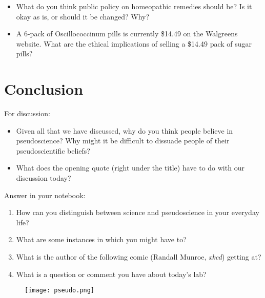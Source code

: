 \documentclass[12pt]{article}
\begin{document}
\begin{itemize}
\item What do you think public policy on homeopathic remedies should be? Is it okay as is, or should it be changed? Why?
\item A 6-pack of Oscillococcinum pills is currently \$14.49 on the Walgreens website. What are the ethical implications of selling a \$14.49 pack of sugar pills? 
\end{itemize}

\section{Conclusion}
For discussion:
\begin{itemize}
\item Given all that we have discussed, why do you think people believe in pseudoscience? Why might it be difficult to dissuade people of their pseudoscientific beliefs?
\item What does the opening quote (right under the title) have to do with our discussion today?
\end{itemize}
Answer in your notebook:
\begin{enumerate}
\item How can you distinguish between science and pseudoscience in your everyday life? 
\item What are some instances in which you might have to?
\item What is the author of the following comic (Randall Munroe, \textit{xkcd}) getting at?
\item What is a question or comment you have about today's lab?
\end{enumerate}
\begin{figure}[th]
\begin{center}
\texttt{[image: pseudo.png]}
\end{center}
\end{figure}
\end{document}
